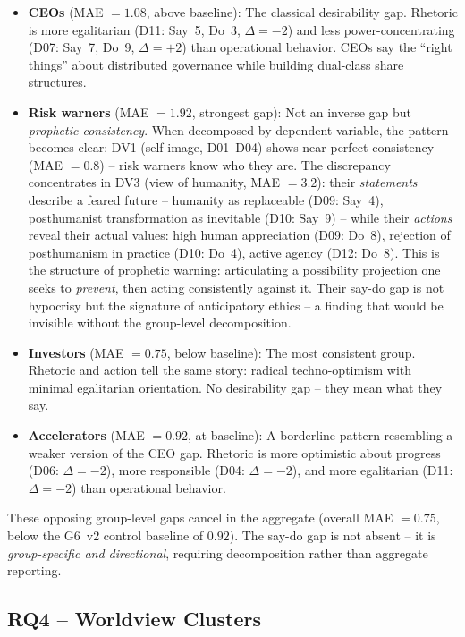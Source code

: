 \documentclass[12pt,a4paper]{article}
\begin{document}
\begin{itemize}
\item \textbf{CEOs} (MAE $= 1.08$, above baseline): The classical desirability gap. Rhetoric is more egalitarian (D11: Say~5, Do~3, $\Delta = -2$) and less power-concentrating (D07: Say~7, Do~9, $\Delta = +2$) than operational behavior. CEOs say the ``right things'' about distributed governance while building dual-class share structures.

\item \textbf{Risk warners} (MAE $= 1.92$, strongest gap): Not an inverse gap but \emph{prophetic consistency}. When decomposed by dependent variable, the pattern becomes clear: DV1 (self-image, D01--D04) shows near-perfect consistency (MAE $= 0.8$) -- risk warners know who they are. The discrepancy concentrates in DV3 (view of humanity, MAE $= 3.2$): their \emph{statements} describe a feared future -- humanity as replaceable (D09: Say~4), posthumanist transformation as inevitable (D10: Say~9) -- while their \emph{actions} reveal their actual values: high human appreciation (D09: Do~8), rejection of posthumanism in practice (D10: Do~4), active agency (D12: Do~8). This is the structure of prophetic warning: articulating a possibility projection one seeks to \emph{prevent}, then acting consistently against it. Their say-do gap is not hypocrisy but the signature of anticipatory ethics -- a finding that would be invisible without the group-level decomposition.

\item \textbf{Investors} (MAE $= 0.75$, below baseline): The most consistent group. Rhetoric and action tell the same story: radical techno-optimism with minimal egalitarian orientation. No desirability gap -- they mean what they say.

\item \textbf{Accelerators} (MAE $= 0.92$, at baseline): A borderline pattern resembling a weaker version of the CEO gap. Rhetoric is more optimistic about progress (D06: $\Delta = -2$), more responsible (D04: $\Delta = -2$), and more egalitarian (D11: $\Delta = -2$) than operational behavior.
\end{itemize}

\noindent These opposing group-level gaps cancel in the aggregate (overall MAE $= 0.75$, below the G6~v2 control baseline of $0.92$). The say-do gap is not absent -- it is \emph{group-specific and directional}, requiring decomposition rather than aggregate reporting.


\subsection{RQ4 -- Worldview Clusters}
\label{sec:ergebnisse:f4}
\end{document}
